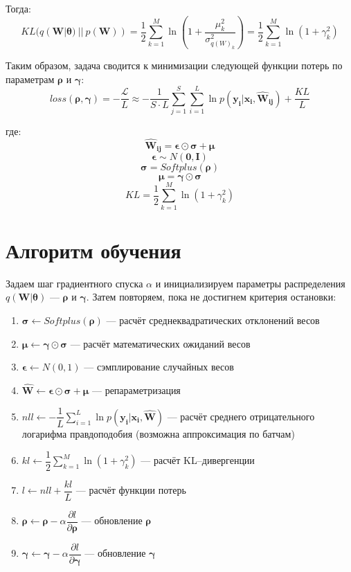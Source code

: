 \documentclass{article}
\begin{document}
Тогда:
\[
KL(q(\pmb{W} | \pmb{\theta})~||~p(\pmb{W})) =
\dfrac{1}{2}\sum_{k=1}^{M}\ln({1 + \dfrac{\mu_{k}^2}{\sigma_{{q(W)_{k}}}^2}}) =
\dfrac{1}{2}\sum_{k=1}^{M}\ln({1 + \gamma_{k}^{2}})
\]

Таким образом, задача сводится к минимизации следующей функции потерь по параметрам $\pmb{\rho}$ и $\pmb{\gamma}$:
\[
loss(\pmb{\rho}, \pmb{\gamma}) =
- \dfrac{\mathcal{L}}{L} \approx
 -\dfrac{1}{S \cdot L} \sum_{j=1}^S \sum_{i=1}^{L}  {\ln{p(\pmb{y_{i}} | \pmb{x_{i}}, \pmb{\hat{W}_{ij}})}} + \dfrac{KL}{L}
\]

где:
\[
 \pmb{\hat{W}_{ij}} = \pmb{\epsilon} \odot \pmb{\sigma} + \pmb{\mu}
\]
\[
 \pmb{\epsilon} \sim N(\pmb{0}, \pmb{I})
\]
\[
 \pmb{\sigma} = Softplus(\pmb{\rho})
\]
\[
 \pmb{\mu} = \pmb{\gamma} \odot \pmb{\sigma}
\]
\[
 KL = \dfrac{1}{2}\sum_{k=1}^{M}\ln({1 + \gamma_{k}^{2}})
\]

\section{Алгоритм обучения}

Задаем шаг градиентного спуска $\alpha$ и инициализируем параметры распределения $q(\pmb{W} | \pmb{\theta})$ — $\pmb{\rho}$ и $\pmb{\gamma}$. Затем повторяем, пока не достигнем критерия остановки:
\begin{enumerate}
    \item $\pmb{\sigma} \leftarrow Softplus(\pmb{\rho})$ --- расчёт среднеквадратических отклонений весов
    \item $\pmb{\mu} \leftarrow \pmb{\gamma} \odot \pmb{\sigma}$ --- расчёт математических ожиданий весов
    \item $\pmb{\epsilon} \leftarrow N(0, 1)$ --- сэмплирование случайных весов
    \item $\hat{\pmb{W}} \leftarrow \pmb{\epsilon} \odot \pmb{\sigma} + \pmb{\mu}$ --- репараметризация
    \item $nll \leftarrow -\dfrac{1}{L}\sum_{i=1}^{L}{\ln{p( \pmb{y_{i}} | \pmb{x_{i}}, \pmb{\hat{W}})}}$ --- расчёт среднего отрицательного логарифма правдоподобия (возможна аппроксимация по батчам)
    \item $kl \leftarrow \dfrac{1}{2}\sum_{k=1}^{M}\ln({1 + \gamma_{k}^{2}})$ --- расчёт KL--дивергенции
    \item $l \leftarrow nll + \dfrac{kl}{L}$ --- расчёт функции потерь
    \item $\pmb{\rho} \leftarrow \pmb{\rho} - \alpha \dfrac{\partial l}{\partial \pmb{\rho}}$ --- обновление $\pmb{\rho}$
    \item $\pmb{\gamma} \leftarrow \pmb{\gamma} - \alpha \dfrac{\partial l}{\partial \pmb{\gamma}}$ --- обновление $\pmb{\gamma}$
\end{enumerate}
\end{document}
